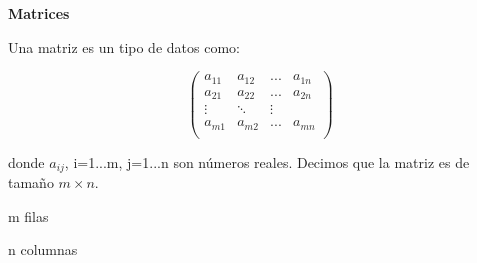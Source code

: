 \begin{frame}

\textbf{Matrices}

\hfill

Una matriz es un tipo de datos como:

\hfill

$$
\begin{pmatrix}
a_{11} & a_{12} & ... & a_{1n} \\
a_{21} & a_{22} & ... & a_{2n} \\ 
\vdots  &  \ddots  & \vdots \\
a_{m1} & a_{m2} & ... & a_{mn} \\
\end{pmatrix}
$$

\hfill

donde $a_{ij}$, i=1...m, j=1...n son números reales.
Decimos que la matriz es de tamaño $m \times n$.

\hfill

m filas

n columnas

\end{frame}
